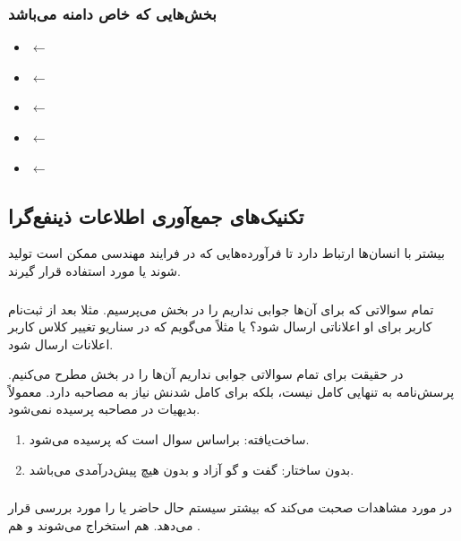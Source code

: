 \subsubsection*{بخش‌هایی که خاص دامنه می‌باشد}

\begin{itemize}
    \item {} $\leftarrow$ 
    \item {} $\leftarrow$ 
    \item {} $\leftarrow$ 
    \item {} $\leftarrow$ 
    \item {} $\leftarrow$ 
\end{itemize}

\subsection{تکنیک‌های جمع‌آوری اطلاعات ذینفع‌گرا}

بیشتر با انسان‌ها ارتباط دارد تا فرآورده‌هایی که در فرایند مهندسی ممکن است تولید
شوند یا مورد استفاده قرار گیرند.

\subsubsection{}

تمام سوالاتی که برای آن‌ها جوابی نداریم را در بخش  می‌پرسیم. مثلا
بعد از ثبت‌نام کاربر برای او اعلاناتی ارسال شود؟ یا مثلاً می‌گویم که در سناریو
تغییر کلاس کاربر اعلانات ارسال شود.

در حقیقت برای تمام سوالاتی جوابی نداریم آن‌ها را در بخش  مطرح
می‌کنیم. پرسش‌نامه به تنهایی کامل نیست، بلکه برای کامل شدنش نیاز به مصاحبه دارد.
معمولاً بدیهیات در مصاحبه پرسیده نمی‌شود.

\begin{enumerate}
    \item ساخت‌یافته: براساس سوال است که پرسیده می‌شود.
    \item بدون ساختار: گفت و گو آزاد و بدون هیچ پیش‌درآمدی می‌باشد.
\end{enumerate}

\subsubsection{}

در مورد مشاهدات صحبت می‌کند که بیشتر سیستم حال حاضر یا  را مورد
بررسی قرار می‌دهد. هم  استخراج می‌شوند و هم
.

